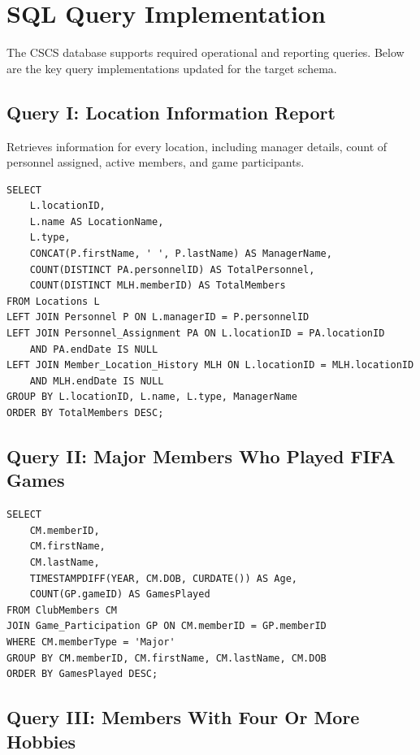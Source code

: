 \documentclass[11pt,a4paper]{article}
\begin{document}
\section{SQL Query Implementation}


The CSCS database supports required operational and reporting queries. Below are the key query implementations updated for the target schema.


\subsection{Query I: Location Information Report}

Retrieves information for every location, including manager details, count of personnel assigned, active members, and game participants.

\begin{verbatim}
SELECT 
    L.locationID,
    L.name AS LocationName,
    L.type,
    CONCAT(P.firstName, ' ', P.lastName) AS ManagerName,
    COUNT(DISTINCT PA.personnelID) AS TotalPersonnel,
    COUNT(DISTINCT MLH.memberID) AS TotalMembers
FROM Locations L
LEFT JOIN Personnel P ON L.managerID = P.personnelID
LEFT JOIN Personnel_Assignment PA ON L.locationID = PA.locationID 
    AND PA.endDate IS NULL
LEFT JOIN Member_Location_History MLH ON L.locationID = MLH.locationID 
    AND MLH.endDate IS NULL
GROUP BY L.locationID, L.name, L.type, ManagerName
ORDER BY TotalMembers DESC;
\end{verbatim}


\subsection{Query II: Major Members Who Played FIFA Games}

\begin{verbatim}
SELECT 
    CM.memberID,
    CM.firstName,
    CM.lastName,
    TIMESTAMPDIFF(YEAR, CM.DOB, CURDATE()) AS Age,
    COUNT(GP.gameID) AS GamesPlayed
FROM ClubMembers CM
JOIN Game_Participation GP ON CM.memberID = GP.memberID
WHERE CM.memberType = 'Major'
GROUP BY CM.memberID, CM.firstName, CM.lastName, CM.DOB
ORDER BY GamesPlayed DESC;
\end{verbatim}


\subsection{Query III: Members With Four Or More Hobbies}
\end{document}
